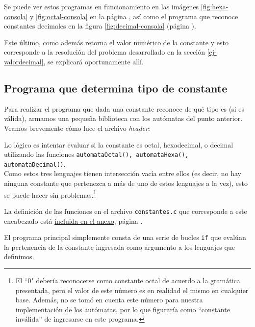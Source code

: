 \documentclass[a4paper, 12pt]{article}
\begin{document}
Se puede ver estos programas en funcionamiento en las imágenes \ref{fig:hexa-consola} y \ref{fig:octal-consola} en la página \pageref{fig:hexa-consola}, así como el programa que reconoce constantes decimales en la figura \ref{fig:decimal-consola} (página \pageref{fig:decimal-consola}).

Este último, como además retorna el valor numérico de la constante y esto corresponde a la resolución del problema desarrollado en la sección \ref{ej-valordecimal}, se explicará oportunamente allí.

\vspace{1cm}

\subsection{Programa que determina tipo de constante}
\label{ej-reconocedor}
\medbreak

Para realizar el programa que dada una constante reconoce de qué tipo es (si es válida), armamos una pequeña biblioteca con los autómatas del punto anterior. Veamos brevemente cómo luce el archivo \textit{header}:



Lo lógico es intentar evaluar si la constante es octal, hexadecimal, o decimal utilizando las funciones \texttt{automataOctal(), automataHexa(), automataDecimal()}. \\
Como estos tres lenguajes tienen intersección vacía entre ellos (es decir, no hay ninguna constante que pertenezca a más de uno de estos lenguajes a la vez), esto se puede hacer sin problemas.\footnote{El ``0" debería reconocerse como constante octal de acuerdo a la gramática presentada, pero el valor de este número es en realidad el mismo en cualquier base. Además, no se tomó en cuenta este número para nuestra implementación de los autómatas, por lo que figuraría como ``constante inválida'' de ingresarse en este programa.}

La definición de las funciones en el archivo \texttt{constantes.c} que corresponde a este encabezado está \hyperref[constantesc]{incluida en el anexo}, página \pageref{anexo}.

El programa principal simplemente consta de una serie de bucles \texttt{if} que evalúan la pertenencia de la constante ingresada como argumento a los lenguajes que definimos.


\end{document}
